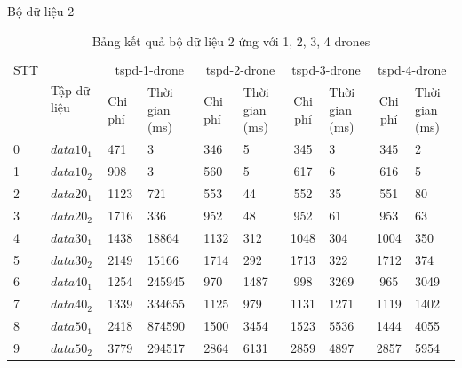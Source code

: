 \documentclass[compress]{beamer}
\begin{document}
\begin{frame}{Bộ dữ liệu 2}
\tiny
\begin{longtable}{|p{0.2cm}|p{1.0cm}|p{0.55cm}|p{0.85cm}|p{0.6cm}|p{0.7cm}|c|p{0.85cm}|c|p{0.85cm}|}
\caption{Bảng kết quả bộ dữ liệu 2 ứng với 1, 2, 3, 4 drones}
\label{tabletspkd2}\\ 
\toprule
STT&\multirow{2}{*}{Tập dữ liệu} & \multicolumn{2}{c|}{tspd-1-drone } &\multicolumn{2}{c|}{tspd-2-drone } &\multicolumn{2}{c|}{tspd-3-drone }&\multicolumn{2}{c|}{tspd-4-drone } \\
\cline{3-10} 
&&Chi phí &Thời gian (ms)&Chi phí &Thời gian (ms)&Chi phí &Thời gian (ms)&Chi phí &Thời gian (ms)\\
\midrule
\toprule
0&$data 10_1$&471& 3
&346& 5
&345& 3
&345& 2\\
\hline
1&$data 10_2$&908& 3
&560& 5
&617& 6
&616& 5 \\
\hline
2&$data 20_1$&1123& 721
&553& 44
&552& 35
&551& 80\\
\hline
3&$data 20_2$&1716&  336
&952& 48
&952& 61
&953& 63 \\
\hline
4&$data 30_1$&1438& 18864
&1132& 312
&1048& 304
&1004& 350 \\
\hline
5&$data 30_2$&2149& 15166
&1714& 292
&1713& 322
&1712& 374 \\
\hline

6&$data 40_1$&1254& 245945
&970& 1487
&998&  3269
&965& 3049 \\
\hline
7&$data 40_2$&1339& 334655
&1125& 979
&1131& 1271
&1119 &1402 \\
\hline

8&$data 50_1$&2418& 874590
&1500& 3454
&1523& 5536
&1444& 4055 \\
\hline

9&$data 50_2$ & 3779 & 294517
& 2864 &6131
&2859 &4897
&2857 &5954 \\
\hline





\end{longtable}
\end{frame}
\end{document}
